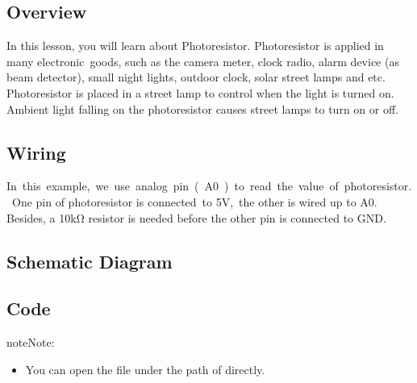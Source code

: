\documentclass[a4paper,11pt,english]{sphinxmanual}
\begin{document}
\subsection{Overview}
\label{\detokenize{Basic_Project/Photoresistor:overview}}
\sphinxAtStartPar
In this lesson, you will learn about Photoresistor. Photoresistor is applied in many electronic goods, such as the camera meter, clock radio, alarm device (as beam detector), small night lights, outdoor clock, solar street lamps and etc. Photoresistor is placed in a street lamp to control when the light is turned on. Ambient light falling on the photoresistor causes street lamps to turn on or off.


\subsection{Wiring}
\label{\detokenize{Basic_Project/Photoresistor:wiring}}
\sphinxAtStartPar
In this example, we use analog pin ( A0 ) to read the value of photoresistor. One pin of photoresistor is connected to 5V, the other is wired up to A0. Besides, a 10kΩ resistor is needed before the other pin is connected to GND.



\subsection{Schematic Diagram}
\label{\detokenize{Basic_Project/Photoresistor:schematic-diagram}}


\subsection{Code}
\label{\detokenize{Basic_Project/Photoresistor:code}}
\begin{sphinxadmonition}{note}{Note:}\begin{itemize}
\item {} 
\sphinxAtStartPar
You can open the file  under the path of  directly.

\end{itemize}
\end{sphinxadmonition}
\end{document}
